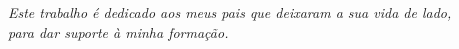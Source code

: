 \begin{dedicatoria}
   \vspace*{\fill}
   \centering
   \noindent
   \textit{Este trabalho é dedicado aos meus pais que deixaram a sua vida de lado,\\
 para dar suporte à minha formação.} \vspace*{\fill}
\end{dedicatoria}

